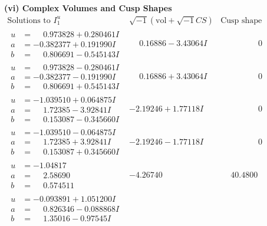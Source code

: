 \documentclass[1p]{elsarticle_modified}
\theoremstyle{definition}
\newcommand{\I}{\sqrt{-1}}
\begin{document}
\newpage\flushleft \textbf{(vi) Complex Volumes and Cusp Shapes}
$$\begin{array}{c|c|c}  
\text{Solutions to }I^u_{1}& \I (\text{vol} + \sqrt{-1}CS) & \text{Cusp shape}\\
 \hline 
\begin{aligned}
u &= \phantom{-}0.973828 + 0.280461 I \\
a &= -0.382377 + 0.191990 I \\
b &= \phantom{-}0.806691 - 0.545143 I\end{aligned}
 & \phantom{-}0.16886 - 3.43064 I & \phantom{-0.000000 } 0 \\ \hline\begin{aligned}
u &= \phantom{-}0.973828 - 0.280461 I \\
a &= -0.382377 - 0.191990 I \\
b &= \phantom{-}0.806691 + 0.545143 I\end{aligned}
 & \phantom{-}0.16886 + 3.43064 I & \phantom{-0.000000 } 0 \\ \hline\begin{aligned}
u &= -1.039510 + 0.064875 I \\
a &= \phantom{-}1.72385 - 3.92841 I \\
b &= \phantom{-}0.153087 - 0.345660 I\end{aligned}
 & -2.19246 + 1.77118 I & \phantom{-0.000000 } 0 \\ \hline\begin{aligned}
u &= -1.039510 - 0.064875 I \\
a &= \phantom{-}1.72385 + 3.92841 I \\
b &= \phantom{-}0.153087 + 0.345660 I\end{aligned}
 & -2.19246 - 1.77118 I & \phantom{-0.000000 } 0 \\ \hline\begin{aligned}
u &= -1.04817\phantom{ +0.000000I} \\
a &= \phantom{-}2.58690\phantom{ +0.000000I} \\
b &= \phantom{-}0.574511\phantom{ +0.000000I}\end{aligned}
 & -4.26740\phantom{ +0.000000I} & \phantom{-}40.4800\phantom{ +0.000000I} \\ \hline\begin{aligned}
u &= -0.093891 + 1.051200 I \\
a &= \phantom{-}0.826346 - 0.088868 I \\
b &= \phantom{-}1.35016 - 0.97545 I\end{aligned}

\end{array}$$
\end{document}
